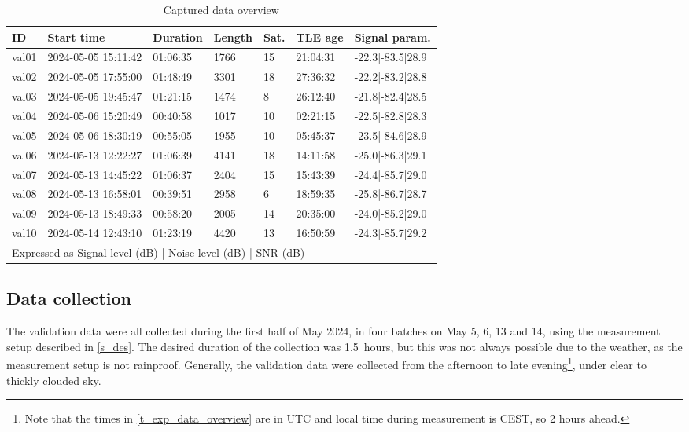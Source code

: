\begin{table}
    \centering
    \begin{tabular}{lp{0.75in}lllll}
ID    & Start time          & Duration & Length & Sat. & TLE age   & Signal param.\sc{*}       \\\hline
val01 & 2024-05-05 15:11:42 & 01:06:35 & 1766   & 15     & 21:04:31  & -22.3|-83.5|28.9 \\
val02 & 2024-05-05 17:55:00 & 01:48:49 & 3301   & 18     & 27:36:32  & -22.2|-83.2|28.8 \\
val03 & 2024-05-05 19:45:47 & 01:21:15 & 1474   & 8      & 26:12:40  & -21.8|-82.4|28.5 \\
val04 & 2024-05-06 15:20:49 & 00:40:58 & 1017   & 10     & 02:21:15  & -22.5|-82.8|28.3 \\
val05 & 2024-05-06 18:30:19 & 00:55:05 & 1955   & 10     & 05:45:37  & -23.5|-84.6|28.9 \\
val06 & 2024-05-13 12:22:27 & 01:06:39 & 4141   & 18     & 14:11:58  & -25.0|-86.3|29.1 \\
val07 & 2024-05-13 14:45:22 & 01:06:37 & 2404   & 15     & 15:43:39  & -24.4|-85.7|29.0 \\
val08 & 2024-05-13 16:58:01 & 00:39:51 & 2958   & 6      & 18:59:35  & -25.8|-86.7|28.7 \\
val09 & 2024-05-13 18:49:33 & 00:58:20 & 2005   & 14     & 20:35:00  & -24.0|-85.2|29.0 \\
val10 & 2024-05-14 12:43:10 & 01:23:19 & 4420   & 13     & 16:50:59  & -24.3|-85.7|29.2 \\
\multicolumn{7}{l}{\sc{*}Expressed as Signal level (dB) | Noise level (dB) | SNR (dB)}
    \end{tabular}
    \caption{Captured data overview}
    \label{t_exp_data_overview}
\end{table}



\subsection{Data collection}
The validation data were all collected during the first half of May 2024, in four batches on May 5, 6, 13 and 14, using the measurement setup described in \autoref{s_des}. The desired duration of the collection was \qty{1.5}{hours}, but this was not always possible due to the weather, as the measurement setup is not rainproof. Generally, the validation data were collected from the afternoon to late evening\footnote{Note that the times in \autoref{t_exp_data_overview} are in UTC and local time during measurement is CEST, so 2 hours ahead.}, under clear to thickly clouded sky.

